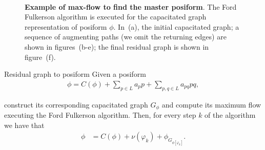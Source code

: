 \begin{figure}
{}\\%
%
\caption{\textbf{Example of max-flow to find the master posiform}. The Ford Fulkerson algorithm is executed for the capacitated graph representation of posiform $\phi$. In~(a), the initial capacitated graph; a sequence of augmenting paths (we omit the returning edges) are shown in figures~(b-e); the final residual graph is shown in figure~(f).  }
\label{ch2:fig:posiform-capacitated-graph}
\end{figure}
%
\begin{proposition}{Residual graph to posiform}
	Given a posiform 
	\begin{align*}
		\phi = C(\phi) + \sum_{p \in L}{a_pp} + \sum_{p,q \in L}{a_{pq}pq},
	\end{align*}
	
	construct its corresponding capacitated graph $G_{\phi}$ and compute its maximum flow executing the Ford Fulkerson algorithm. Then, for every step $k$ of the algorithm we have that
	\begin{align*}
		\phi &= C(\phi) + \nu(\varphi_k) + \phi_{ G_{ \phi [\varphi_k]}}.
	\end{align*}
\end{proposition}
%
